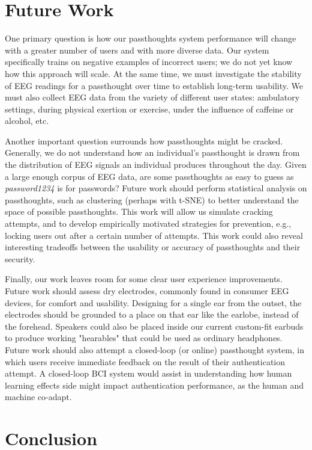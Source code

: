 \documentclass{sigchi}
\begin{document}
\section{Future Work}

One primary question is how our passthoughts system performance will change with a greater number of users and with more diverse data. Our system specifically trains on negative examples of incorrect users; we do not yet know how this approach will scale. At the same time, we must investigate the stability of EEG readings for a passthought over time to establish long-term usability. We must also collect EEG data from the variety of different user states: ambulatory settings, during physical exertion or exercise, under the influence of caffeine or alcohol, etc.

Another important question surrounds how passthoughts might be cracked. Generally, we do not understand how an individual's passthought is drawn from the distribution of EEG signals an individual produces throughout the day. Given a large enough corpus of EEG data, are some passthoughts as easy to guess as \textit{password1234} is for passwords? Future work should perform statistical analysis on passthoughts, such as clustering (perhaps with t-SNE) to better understand the space of possible passthoughts. This work will allow us simulate cracking attempts, and to develop empirically motivated strategies for prevention, e.g., locking users out after a certain number of attempts. This work could also reveal interesting tradeoffs between the usability or accuracy of passthoughts and their security.

Finally, our work leaves room for some clear user experience improvements. Future work should assess dry electrodes, commonly found in consumer EEG devices, for comfort and usability. Designing for a single ear from the outset, the electrodes should be grounded to a place on that ear like the earlobe, instead of the forehead. Speakers could also be placed inside our current custom-fit earbuds to produce working "hearables" that could be used as ordinary headphones. Future work should also attempt a closed-loop (or online) passthought system, in which users receive immediate feedback on the result of their authentication attempt. A closed-loop BCI system would assist in understanding how human learning effects side might impact authentication performance, as the human and machine co-adapt.

\section{Conclusion}
\end{document}
